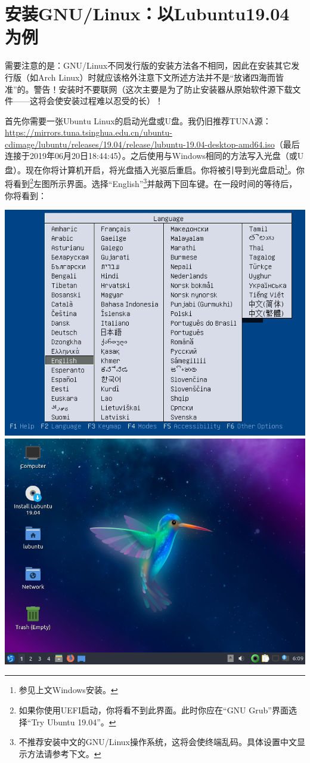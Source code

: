 \documentclass{book}
\begin{document}
\section{安装GNU/Linux：以Lubuntu19.04为例}
需要注意的是：GNU/Linux不同发行版的安装方法各不相同，因此在安装其它发行版（如Arch Linux）时就应该格外注意下文所述方法并不是“放诸四海而皆准”的。警告！安装时不要联网（这次主要是为了防止安装器从原始软件源下载文件——这将会使安装过程难以忍受的长）！\par
首先你需要一张Ubuntu Linux的启动光盘或U盘。我仍旧推荐TUNA源：\url{https://mirrors.tuna.tsinghua.edu.cn/ubuntu-cdimage/lubuntu/releases/19.04/release/lubuntu-19.04-desktop-amd64.iso}（最后连接于2019年06月20日18:44:45）。之后使用与Windows相同的方法写入光盘（或U盘）。现在你将计算机开启，将光盘插入光驱后重启。你将被引导到光盘启动\footnote{参见上文Windows安装。}。你将看到\footnote{如果你使用UEFI启动，你将看不到此界面。此时你应在“GNU Grub”界面选择“Try Ubuntu 19.04”。}左图所示界面。选择“English”\footnote{不推荐安装中文的GNU/Linux操作系统，这将会使终端乱码。具体设置中文显示方法请参考下文。}并敲两下回车键。在一段时间的等待后，你将看到：
\begin{center}
	\includegraphics[scale=0.5]{pic/lubinst1}	\includegraphics[scale=0.4]{pic/lubinst2}
\end{center}
\end{document}
